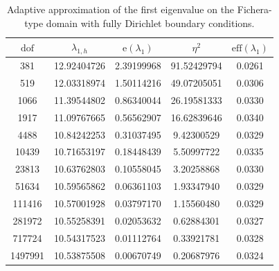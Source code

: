 \documentclass[onefignum,onetabnum,final]{siamart250211}
\numberwithin{equation}{section}
\newcommand\0{\boldsymbol{0}}
\begin{document}
\begin{table}[htbp!]
\centering
\caption{Adaptive approximation of the first eigenvalue on the Fichera-type domain with
fully Dirichlet boundary conditions.}
\label{tab:fichera-eig1-dirichlet}
\begin{tabular}{c c c c c}
\hline
$\mathrm{dof}$ & $\lambda_{1,h}$ &
$\textrm{e}(\lambda_{1})$ & $\eta^2$ &
$\mathrm{eff}(\lambda_1)$ \\
\hline
381     & 12.92404726 & 2.39199968 & 91.52429794 & 0.0261 \\
519     & 12.03318974 & 1.50114216 & 49.07205051 & 0.0306 \\
1066    & 11.39544802 & 0.86340044 & 26.19581333 & 0.0330 \\
1917    & 11.09767665 & 0.56562907 & 16.62839646 & 0.0340 \\
4488    & 10.84242253 & 0.31037495 & 9.42300529  & 0.0329 \\
10439   & 10.71653197 & 0.18448439 & 5.50997722  & 0.0335 \\
23813   & 10.63762803 & 0.10558045 & 3.20258868  & 0.0330 \\
51634   & 10.59565862 & 0.06361103 & 1.93347940  & 0.0329 \\
111416  & 10.57001928 & 0.03797170 & 1.15560480  & 0.0329 \\
281972  & 10.55258391 & 0.02053632 & 0.62884301  & 0.0327 \\
717724  & 10.54317523 & 0.01112764 & 0.33921781  & 0.0328 \\
1497991 & 10.53875508 & 0.00670749 & 0.20687976  & 0.0324 \\
\hline
\end{tabular}
\end{table}
\end{document}
